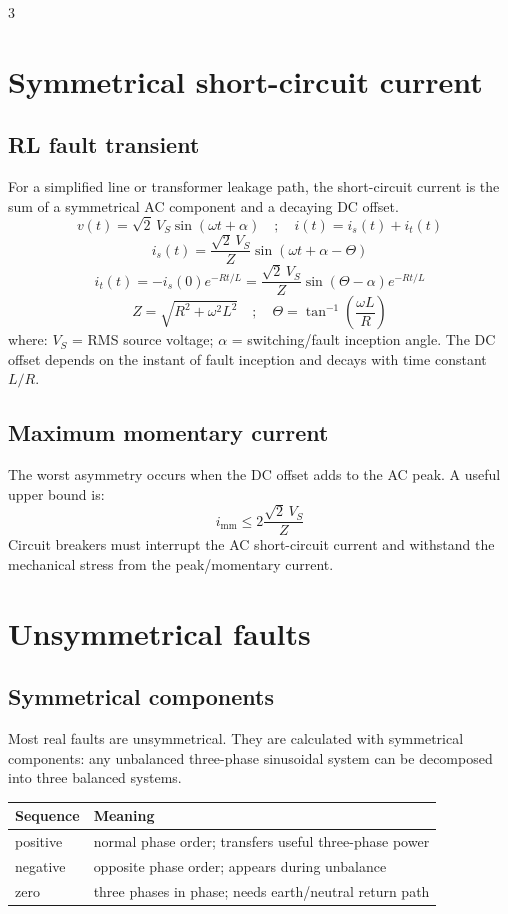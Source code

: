 \documentclass[9pt, landscape, a4paper]{article}
\begin{document}
\begin{multicols*}{3}
\section{Symmetrical short-circuit current}
\subsection{RL fault transient}
For a simplified line or transformer leakage path, the short-circuit current is
the sum of a symmetrical AC component and a decaying DC offset.
\[
  v(t)=\sqrt2\,V_S\sin(\omega t+\alpha)
  \quad ; \quad
  i(t)=i_s(t)+i_t(t)
\]
\[
  i_s(t)=\frac{\sqrt2\,V_S}{Z}\sin(\omega t+\alpha-\Theta)
\]
\[
  i_t(t)=-i_s(0)e^{-Rt/L}
  =\frac{\sqrt2\,V_S}{Z}\sin(\Theta-\alpha)e^{-Rt/L}
\]
\[
  Z=\sqrt{R^2+\omega^2L^2}
  \quad ; \quad
  \Theta=\tan^{-1}\left(\frac{\omega L}{R}\right)
\]
where: $V_S$ = RMS source voltage; $\alpha$ = switching/fault inception angle.
The DC offset depends on the instant of fault inception and decays with time
constant $L/R$.

\subsection{Maximum momentary current}
The worst asymmetry occurs when the DC offset adds to the AC peak. A useful
upper bound is:
\[
  i_{\mathrm{mm}}\leq2\frac{\sqrt2\,V_S}{Z}
\]
Circuit breakers must interrupt the AC short-circuit current and withstand the
mechanical stress from the peak/momentary current.

\section{Unsymmetrical faults}
\subsection{Symmetrical components}
Most real faults are unsymmetrical. They are calculated with symmetrical
components: any unbalanced three-phase sinusoidal system can be decomposed into
three balanced systems.

\begin{tabularx}{\columnwidth}{@{}lX@{}}
  \toprule
  \textbf{Sequence} & \textbf{Meaning}\\
  \midrule
  positive & normal phase order; transfers useful three-phase power\\
  negative & opposite phase order; appears during unbalance\\
  zero & three phases in phase; needs earth/neutral return path\\
  \bottomrule
\end{tabularx}


\end{multicols*}
\end{document}
